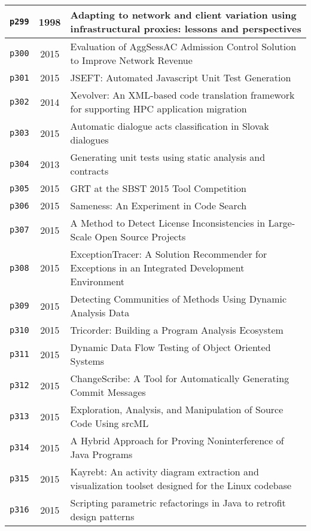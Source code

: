 \begin{longtable}{| c | c | p{16cm} |}
  \hline
  \texttt{p299} & 1998 & Adapting to network and client variation using infrastructural proxies: lessons and perspectives \\
  \hline
  \texttt{p300} & 2015 & Evaluation of AggSessAC Admission Control Solution to Improve Network Revenue \\
  \hline
  \texttt{p301} & 2015 & JSEFT: Automated Javascript Unit Test Generation \\
  \hline
  \texttt{p302} & 2014 & Xevolver: An XML-based code translation framework for supporting HPC application migration \\
  \hline
  \texttt{p303} & 2015 & Automatic dialogue acts classification in Slovak dialogues \\
  \hline
  \texttt{p304} & 2013 & Generating unit tests using static analysis and contracts \\
  \hline
  \texttt{p305} & 2015 & GRT at the SBST 2015 Tool Competition \\
  \hline
  \texttt{p306} & 2015 & Sameness: An Experiment in Code Search \\
  \hline
  \texttt{p307} & 2015 & A Method to Detect License Inconsistencies in Large-Scale Open Source Projects \\
  \hline
  \texttt{p308} & 2015 & ExceptionTracer: A Solution Recommender for Exceptions in an Integrated Development Environment \\
  \hline
  \texttt{p309} & 2015 & Detecting Communities of Methods Using Dynamic Analysis Data \\
  \hline
  \texttt{p310} & 2015 & Tricorder: Building a Program Analysis Ecosystem \\
  \hline
  \texttt{p311} & 2015 & Dynamic Data Flow Testing of Object Oriented Systems \\
  \hline
  \texttt{p312} & 2015 & ChangeScribe: A Tool for Automatically Generating Commit Messages \\
  \hline
  \texttt{p313} & 2015 & Exploration, Analysis, and Manipulation of Source Code Using srcML \\
  \hline
  \texttt{p314} & 2015 & A Hybrid Approach for Proving Noninterference of Java Programs \\
  \hline
  \texttt{p315} & 2015 & Kayrebt: An activity diagram extraction and visualization toolset designed for the Linux codebase \\
  \hline
  \texttt{p316} & 2015 & Scripting parametric refactorings in Java to retrofit design patterns \\
  \hline

\end{longtable}
